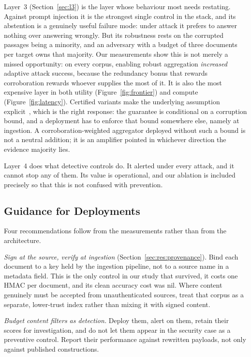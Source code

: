 Layer~3 (Section~\ref{sec:l3}) is the layer whose behaviour most needs restating. Against prompt injection it is the
strongest single control in the stack, and its abstention is a genuinely useful failure mode:
under attack it prefers to answer nothing over answering wrongly. But its robustness rests on
the corrupted passages being a minority, and an adversary with a budget of three documents per
target owns that majority. Our measurements show this is not merely a missed opportunity: on
every corpus, enabling robust aggregation \emph{increased} adaptive attack success, because the
redundancy bonus that rewards corroboration rewards whoever supplies the most of it. It is also
the most expensive layer in both utility (Figure~\ref{fig:frontier}) and compute
(Figure~\ref{fig:latency}). Certified variants make the underlying assumption
explicit~\citep{xiang2024robustrag}, which is the right response: the guarantee is conditional
on a corruption bound, and a deployment has to enforce that bound somewhere else, namely at
ingestion.
A corroboration-weighted aggregator deployed without such a bound is not a neutral addition; it
is an amplifier pointed in whichever direction the evidence majority lies.

Layer~4 does what detective controls do. It alerted under every attack, and it cannot stop any
of them. Its value is operational, and our ablation is included precisely so that this is not
confused with prevention.

\subsection{Guidance for Deployments}

Four recommendations follow from the measurements rather than from the architecture.

\emph{Sign at the source, verify at ingestion} (Section~\ref{sec:res:provenance}). Bind each document to a key held by the
ingestion pipeline, not to a source name in a metadata field. This is the only control in our
study that survived, it costs one HMAC per document, and its clean accuracy cost was nil.
Where content genuinely must be accepted from unauthenticated sources, treat that corpus as a
separate, lower-trust index rather than mixing it with signed content.

\emph{Budget content filters as detection.} Deploy them, alert on them, retain their scores for
investigation, and do not let them appear in the security case as a preventive control. Report
their performance against rewritten payloads, not only against published constructions.


